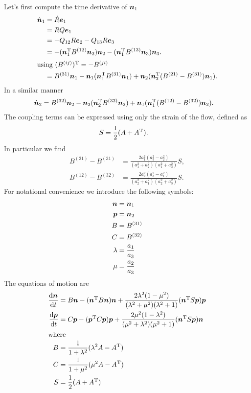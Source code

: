 \documentclass[thesis.tex]{subfiles}
\begin{document}
Let's first compute the time derivative of $\mbox{\boldmath$n$}_1$
\begin{align*}
	\dot{\mbox{\boldmath$n$}}_1 &= \dot{R}\mbox{\boldmath$e$}_1 \\
	&= RQ \mbox{\boldmath$e$}_1 \\
	&= -Q_{12}R \mbox{\boldmath$e$}_2 - Q_{13}R \mbox{\boldmath$e$}_3 \\
	&= -(\mbox{\boldmath$n$}_1^{\mathrm T} B^{(12)} \mbox{\boldmath$n$}_2)\mbox{\boldmath$n$}_2 -(\mbox{\boldmath$n$}_1^{\mathrm T} B^{(13)} \mbox{\boldmath$n$}_3)\mbox{\boldmath$n$}_3.\\
	\intertext{using $(B^{(ij)})^{\mathrm T} = -B^{(ji)}$}
	&= B^{(31)}\mbox{\boldmath$n$}_1 - \mbox{\boldmath$n$}_1 (\mbox{\boldmath$n$}_1^{\mathrm T} B^{(31)}\mbox{\boldmath$n$}_1) + \mbox{\boldmath$n$}_2(\mbox{\boldmath$n$}_2^{\mathrm T} (B^{(21)}-B^{(31)})\mbox{\boldmath$n$}_1).
\end{align*}
In a similar manner
\begin{align*}
	\dot{\mbox{\boldmath$n$}}_2 &= B^{(32)}\mbox{\boldmath$n$}_2 - \mbox{\boldmath$n$}_2 (\mbox{\boldmath$n$}_2^{\mathrm T} B^{(32)}\mbox{\boldmath$n$}_2) + \mbox{\boldmath$n$}_1(\mbox{\boldmath$n$}_1^{\mathrm T} (B^{(12)}-B^{(32)})\mbox{\boldmath$n$}_2).
\end{align*}
The coupling terms can be expressed using only the strain of the flow, defined as
\begin{align*}
	S &= \frac{1}{2}(A+A^{\mathrm T}).
\end{align*}
In particular we find
\begin{align*}
	B^{(21)} - B^{(31)} &= \frac{ 2a_1^2 (a_3^2 - a_2^2) }{(a_1^2+a_2^2)(a_1^2+a_3^2)}S,\\
	B^{(12)} - B^{(32)} &= \frac{ 2a_2^2 (a_3^2 - a_1^2) }{(a_2^2+a_1^2)(a_2^2+a_3^2)}S.
\end{align*}
For notational convenience we introduce the following symbols:
\begin{align*}
	\mbox{\boldmath$n$} &= \mbox{\boldmath$n$}_1\\
	\mbox{\boldmath$p$} &= \mbox{\boldmath$n$}_2\\
	B &= B^{(31)} \\
	C &= B^{(32)} \\
	\lambda &= \frac{a_1}{a_3} \\
	\mu &= \frac{a_2}{a_3}
\end{align*}
The equations of motion are
\begin{align*}
	\frac{\mathrm{d} \mbox{\boldmath$n$}}{\mathrm{d} t} &= B \mbox{\boldmath$n$} - (\mbox{\boldmath$n$}^{\mathrm T} B \mbox{\boldmath$n$})\mbox{\boldmath$n$} + \frac{ 2\lambda^2 (1 - \mu^2) }{(\lambda^2+\mu^2)(\lambda^2+1)}(\mbox{\boldmath$n$}^{\mathrm T} S \mbox{\boldmath$p$})\mbox{\boldmath$p$} \\
	\frac{\mathrm{d} \mbox{\boldmath$p$}}{\mathrm{d} t} &= C \mbox{\boldmath$p$} - (\mbox{\boldmath$p$}^{\mathrm T} C \mbox{\boldmath$p$})\mbox{\boldmath$p$} + \frac{ 2\mu^2 (1 - \lambda^2) }{(\mu^2+\lambda^2)(\mu^2+1)}(\mbox{\boldmath$n$}^{\mathrm T} S \mbox{\boldmath$p$})\mbox{\boldmath$n$} \\
	\intertext{where}
	B &= \frac{1}{1+\lambda^2}(\lambda^2 A - A^{\mathrm T}) \\
	C &= \frac{1}{1+\mu^2}(\mu^2 A - A^{\mathrm T}) \\
	S &= \frac{1}{2}(A + A^{\mathrm T})
\end{align*}
\end{document}
